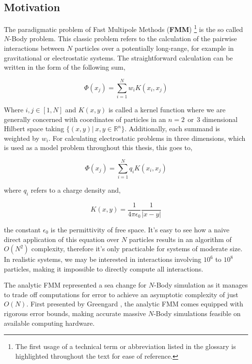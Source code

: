 \subsection{Motivation}

The paradigmatic problem of Fast Multipole Methods (\textbf{\gls{FMM}})
\footnote{The first usage of a technical term or abbreviation listed in the
glossary is highlighted throughout the text for ease of reference.} is the so
called $N$-Body problem. This classic problem refers to the calculation of the pairwise
interactions between $N$ particles over a potentially long-range, for example in
gravitational or electrostatic systems. The straightforward calculation can be
written in the form of the following sum,

\begin{equation}
\Phi(x_j) = \sum_{i=1}^N w_i K(x_i, x_j)
\label{eq:n_body_problem}
\end{equation}

Where $i, j \in [1,N]$ and $K(x, y)$ is called a kernel function where we are generally
concerned with coordinates of particles in an $n=2 \> \> \text{or} \> \> 3$ dimensional Hilbert space
taking  $\{(x, y) | \> x, y \in \mathbb{R}^n \}$. Additionally, each summand is
weighted by $w_i$. For calculating electrostatic problems in three dimensions,
which is used as a model problem throughout this thesis, this goes to,

\begin{equation}
\Phi(x_j) = \sum_{i=1}^N q_iK(x_i, x_j)
\label{eq:electrostatic_paradigm}
\end{equation}

where $q_i$ refers to a charge density and,

\begin{equation}
    K(x, y) = \frac{1}{4\pi \epsilon_0}\frac{1}{| x - y |}
\label{eq:laplace_kernel}
\end{equation}

the constant $\epsilon_0$ is the permittivity of free space. It's easy to see
how a naive direct application of this equation over $N$ particles
results in an algorithm of $O(N^2)$ complexity, therefore it's only practicable
for systems of moderate size. In realistic systems, we may be interested in
interactions involving $10^{6}$ to $10^8$ particles, making it impossible to
directly compute all interactions.

The analytic \gls{FMM} represented a sea change for $N$-Body simulation as it manages to
trade off computations for error to achieve an asymptotic complexity of just $O(N)$.
First presented by Greengard \cite{Greengard:1987:Yale}, the analytic \gls{FMM} comes
equipped with rigorous error bounds, making accurate massive $N$-Body simulations
feasible on available computing hardware.

